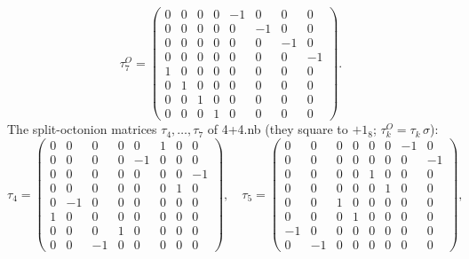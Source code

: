 \documentclass[10pt,a4paper]{article}
\begin{document}
\begin{equation*}
\tau^{O}_7=\begin{pmatrix}0 & 0 & 0 & 0 & -1 & 0 & 0 & 0 \\ 0 & 0 & 0 & 0 & 0 & -1 & 0 & 0 \\ 0 & 0 & 0 & 0 & 0 & 0 & -1 & 0 \\ 0 & 0 & 0 & 0 & 0 & 0 & 0 & -1 \\ 1 & 0 & 0 & 0 & 0 & 0 & 0 & 0 \\ 0 & 1 & 0 & 0 & 0 & 0 & 0 & 0 \\ 0 & 0 & 1 & 0 & 0 & 0 & 0 & 0 \\ 0 & 0 & 0 & 1 & 0 & 0 & 0 & 0\end{pmatrix}.
\end{equation*}
The split-octonion matrices $\tau_4,\dots,\tau_7$ of 4+4.nb (they square to $+1_8$; $\tau^{O}_k=\tau_k\,\sigma$):
\begin{equation*}
\tau_4=\begin{pmatrix}0 & 0 & 0 & 0 & 0 & 1 & 0 & 0 \\ 0 & 0 & 0 & 0 & -1 & 0 & 0 & 0 \\ 0 & 0 & 0 & 0 & 0 & 0 & 0 & -1 \\ 0 & 0 & 0 & 0 & 0 & 0 & 1 & 0 \\ 0 & -1 & 0 & 0 & 0 & 0 & 0 & 0 \\ 1 & 0 & 0 & 0 & 0 & 0 & 0 & 0 \\ 0 & 0 & 0 & 1 & 0 & 0 & 0 & 0 \\ 0 & 0 & -1 & 0 & 0 & 0 & 0 & 0\end{pmatrix},\quad \tau_5=\begin{pmatrix}0 & 0 & 0 & 0 & 0 & 0 & -1 & 0 \\ 0 & 0 & 0 & 0 & 0 & 0 & 0 & -1 \\ 0 & 0 & 0 & 0 & 1 & 0 & 0 & 0 \\ 0 & 0 & 0 & 0 & 0 & 1 & 0 & 0 \\ 0 & 0 & 1 & 0 & 0 & 0 & 0 & 0 \\ 0 & 0 & 0 & 1 & 0 & 0 & 0 & 0 \\ -1 & 0 & 0 & 0 & 0 & 0 & 0 & 0 \\ 0 & -1 & 0 & 0 & 0 & 0 & 0 & 0\end{pmatrix},
\end{equation*}
\end{document}
